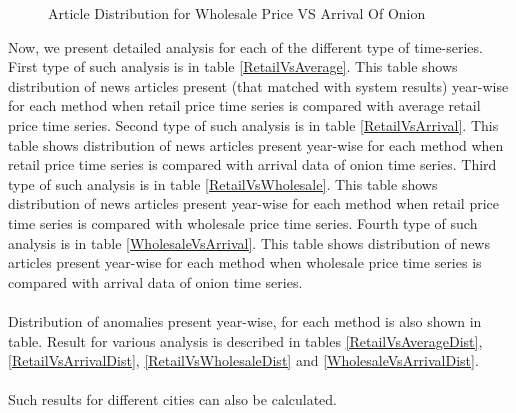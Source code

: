 \begin{figure}[H]
\centering
{}
\caption{Article Distribution for Wholesale Price VS Arrival Of Onion}
\label{fig:articleDistWvsA}
\end{figure}


Now, we present detailed analysis for each of the different type of time-series. First type of such analysis is in table \ref{RetailVsAverage}. This table shows distribution of news articles present (that matched with system results) year-wise for each method when retail price time series is compared with average retail price time series. Second type of such analysis is in table \ref{RetailVsArrival}. This table shows distribution of news articles present year-wise for each method when retail price time series is compared with arrival data of onion time series. Third type of such analysis is in table \ref{RetailVsWholesale}. This table shows distribution of news articles present year-wise for each method when retail price time series is compared with wholesale price time series. Fourth type of such analysis is in table \ref{WholesaleVsArrival}. This table shows distribution of news articles present year-wise for each method when wholesale price time series is compared with arrival data of onion time series.\\
\\
Distribution of anomalies present year-wise, for each method is also shown in table. Result for various analysis is described in tables  \ref{RetailVsAverageDist}, \ref{RetailVsArrivalDist}, \ref{RetailVsWholesaleDist} and \ref{WholesaleVsArrivalDist}.\\
\\
Such results for different cities can also be calculated.

